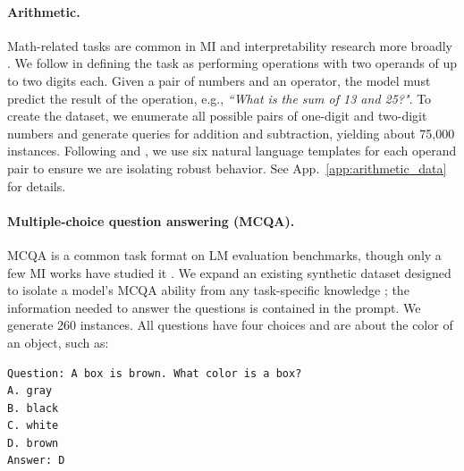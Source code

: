 \documentclass{article}
\theoremstyle{plain}
\theoremstyle{definition}
\theoremstyle{remark}
\newcommand{\arxiv}[1]{#1}
\begin{document}
\paragraph{Arithmetic.}

Math-related tasks are common in MI \citep{stolfo2023mechanistic,nanda2023progress,zhang2024interpreting,nikankin2025arithmetic} and  interpretability research more broadly \citep{liu2023omnigrok,huang2024unified}. We follow \citeauthor{stolfo2023mechanistic} in defining the task as performing operations with two operands of up to two digits each.
Given a pair of numbers and an operator, the model must predict the result of the operation, e.g., \textit{``What is the sum of 13 and 25?"}. 
To create the dataset, we enumerate all possible pairs of one-digit and two-digit numbers and generate queries for addition and subtraction, yielding about 75,000 instances.
Following \citet{karpas2022mrkl} and \citet{stolfo2023mechanistic}, we use six natural language templates for each operand pair to ensure we are isolating robust behavior.
See App.~\ref{app:arithmetic_data} for details.

\paragraph{Multiple-choice question answering (MCQA).}
MCQA is a common task format on LM evaluation benchmarks, though only a few MI works have studied it \cite{lieberum2023does, wiegreffe2024answer, li2024anchored}. We expand an existing synthetic dataset
designed to isolate a model's MCQA ability from any task-specific knowledge \cite{wiegreffe2024answer}\arxiv{; the information needed to answer the questions is contained in the prompt}. We generate 260 instances. 
All questions have four choices and are about the color of an object,  
such as: 
\begin{mdframed}[style=roundedbox]
\small
\begin{verbatim}
Question: A box is brown. What color is a box?
A. gray
B. black
C. white
D. brown
Answer: D
\end{verbatim}
\end{mdframed}
\end{document}
